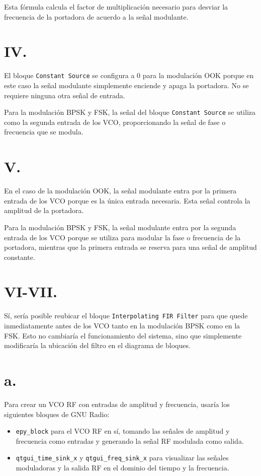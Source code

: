 \documentclass{journal}[IEEEtran, twocolumn]             %
\begin{document}
\begin{multicols}{2}
{Esta fórmula calcula el factor de multiplicación necesario para desviar la frecuencia de la portadora de acuerdo a la señal modulante.

\section*{IV.}
El bloque \texttt{Constant Source} se configura a 0 para la modulación OOK porque en este caso la señal modulante simplemente enciende y apaga la portadora. No se requiere ninguna otra señal de entrada.

Para la modulación BPSK y FSK, la señal del bloque \texttt{Constant Source} se utiliza como la segunda entrada de los VCO, proporcionando la señal de fase o frecuencia que se modula.

\section*{V.}
En el caso de la modulación OOK, la señal modulante entra por la primera entrada de los VCO porque es la única entrada necesaria. Esta señal controla la amplitud de la portadora.

Para la modulación BPSK y FSK, la señal modulante entra por la segunda entrada de los VCO porque se utiliza para modular la fase o frecuencia de la portadora, mientras que la primera entrada se reserva para una señal de amplitud constante.

\section*{VI-VII.}
Sí, sería posible reubicar el bloque \texttt{Interpolating FIR Filter} para que quede inmediatamente antes de los VCO tanto en la modulación BPSK como en la FSK. Esto no cambiaría el funcionamiento del sistema, sino que simplemente modificaría la ubicación del filtro en el diagrama de bloques.


\section*{a.}
Para crear un VCO RF con entradas de amplitud y frecuencia, usaría los siguientes bloques de GNU Radio:

\begin{itemize}
    \item \texttt{epy\_block} para el VCO RF en sí, tomando las señales de amplitud y frecuencia como entradas y generando la señal RF modulada como salida.
    \item \texttt{qtgui\_time\_sink\_x} y \texttt{qtgui\_freq\_sink\_x} para visualizar las señales moduladoras y la salida RF en el dominio del tiempo y la frecuencia.
\end{itemize}

}
\end{multicols}
\end{document}
